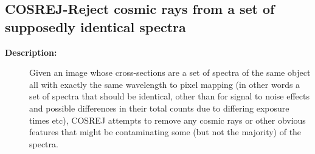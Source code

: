 \subsection{COSREJ-\label{COSREJ}Reject cosmic rays from a set of supposedly identical spectra}
\begin{description}

\item [{\bf Description:}]
 Given an image whose cross-sections are a set of spectra of the
 same object all with exactly the same wavelength to pixel mapping
 (in other words a set of spectra that should be identical, other
 than for signal to noise effects and possible differences in
 their total counts due to differing exposure times etc), COSREJ
 attempts to remove any cosmic rays or other obvious features that
 might be contaminating some (but not the majority) of the spectra.


\end{description}
